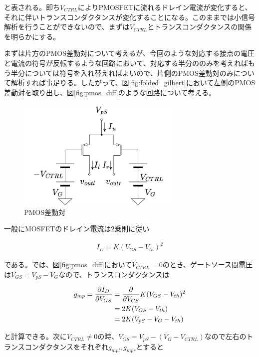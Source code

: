 \documentclass[twocolumn]{jsarticle}
\begin{document}
と表される。即ち$V_{CTRL}$によりPMOSFETに流れるドレイン電流が変化すると、それに伴いトランスコンダクタンスが変化することになる。このままでは小信号解析を行うことができないので、まずは$V_{CTRL}$とトランスコンダクタンスの関係を明らかにする。\par
まずは片方のPMOS差動対について考えるが、今回のような対応する接点の電圧と電流の符号が反転するような回路において、対応する半分ののみを考えればもう半分については符号を入れ替えればよいので、片側のPMOS差動対のみについて解析すれば事足りる。したがって、図\eqref{fig:folded_gilbert}において左側のPMOS差動対を取り出し、図\eqref{fig:pmos_diff}のような回路について考える。

\begin{figure}[h]
    \begin{center}
        \includegraphics*[width=80mm]{figures/pmos_diff.png}
        \caption{PMOS差動対}
        \label{fig:pmos_diff}
    \end{center}
\end{figure}%

一般にMOSFETのドレイン電流は2乗則に従い

\begin{align}
    I_{D}=K(V_{GS}-V_{th})^{2}  \label{eq:square}
\end{align}

である。では、図\eqref{fig:pmos_diff}において$V_{CTRL}=0$のとき、ゲートソース間電圧は$V_{GS}=V_{pS}-V_{G}$なので、トランスコンダクタンスは

\begin{align}
    g_{mp} = \frac{\partial I_{D}}{\partial V_{GS}} &= \frac{\partial}{\partial V_{GS}} K(V_{GS}-V_{th})^{2} \notag\\
    &=2K(V_{GS}-V_{th})    \notag\\ 
    &=2K(V_{pS}-V_{G}-V_{th})   \label{eq:g_mp}
\end{align}

と計算できる。次に$V_{CTRL}\neq0$の時、$V_{GS}=V_{pS}- \left( V_{G}-V_{CTRL} \right)$なので左右のトランスコンダクタンスをそれぞれ$g_{mpl},g_{mpr}$とすると
\end{document}

